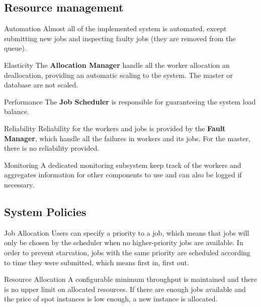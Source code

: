 \documentclass[a4paper]{IEEEtran}
\begin{document}
\subsection*{Resource management}

\begin{LaTeXdescription}
\item[Automation]
Almost all of the implemented system is automated, except submitting new jobs and inspecting faulty jobs (they are removed from the queue).

\item[Elasticity]
The \textbf{Allocation Manager} handle all the worker allocation an deallocation, providing an automatic scaling to the system. The master or database are not scaled.

\item[Performance]
The \textbf{Job Scheduler} is responsible for guaranteeing the system load balance.

\item[Reliability]
Reliability for the workers and jobs is provided by the \textbf{Fault Manager}, which handle all the failures in workers and its jobs. For the master, there is no reliability provided.

\item[Monitoring]
A dedicated monitoring subsystem keep track of the workers and aggregates information for other components to use and can also be logged if necessary.

\end{LaTeXdescription}

\subsection*{System Policies}

\begin{LaTeXdescription}

\item[Job Allocation]
Users can specify a priority to a job, which means that jobs will only be chosen by the scheduler when no higher-priority jobs are available. In order to prevent starvation, jobs with the same priority are scheduled according to time they were submitted, which means first in, first out.

\item[Resource Allocation]
A configurable minimum throughput is maintained and there is no upper limit on allocated resources. If there are enough jobs available and the price of spot instances is low enough, a new instance is allocated.

\end{LaTeXdescription}
\end{document}
